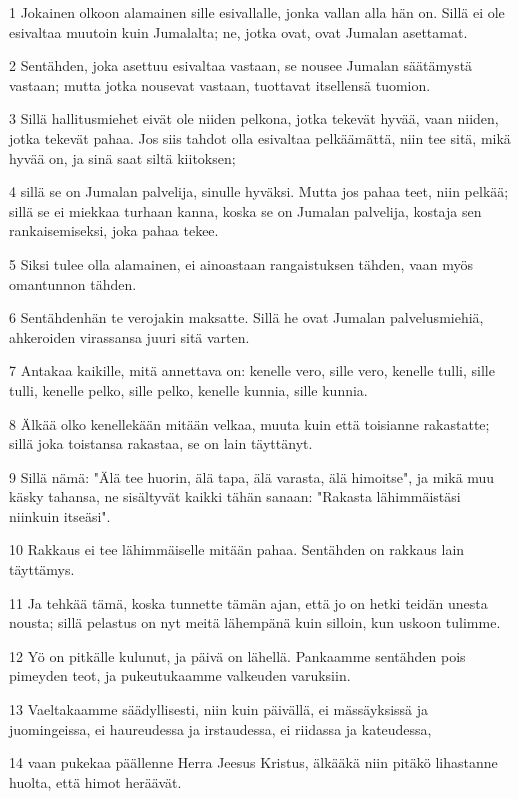 \par 1 Jokainen olkoon alamainen sille esivallalle, jonka vallan alla hän on. Sillä ei ole esivaltaa muutoin kuin Jumalalta; ne, jotka ovat, ovat Jumalan asettamat.
\par 2 Sentähden, joka asettuu esivaltaa vastaan, se nousee Jumalan säätämystä vastaan; mutta jotka nousevat vastaan, tuottavat itsellensä tuomion.
\par 3 Sillä hallitusmiehet eivät ole niiden pelkona, jotka tekevät hyvää, vaan niiden, jotka tekevät pahaa. Jos siis tahdot olla esivaltaa pelkäämättä, niin tee sitä, mikä hyvää on, ja sinä saat siltä kiitoksen;
\par 4 sillä se on Jumalan palvelija, sinulle hyväksi. Mutta jos pahaa teet, niin pelkää; sillä se ei miekkaa turhaan kanna, koska se on Jumalan palvelija, kostaja sen rankaisemiseksi, joka pahaa tekee.
\par 5 Siksi tulee olla alamainen, ei ainoastaan rangaistuksen tähden, vaan myös omantunnon tähden.
\par 6 Sentähdenhän te verojakin maksatte. Sillä he ovat Jumalan palvelusmiehiä, ahkeroiden virassansa juuri sitä varten.
\par 7 Antakaa kaikille, mitä annettava on: kenelle vero, sille vero, kenelle tulli, sille tulli, kenelle pelko, sille pelko, kenelle kunnia, sille kunnia.
\par 8 Älkää olko kenellekään mitään velkaa, muuta kuin että toisianne rakastatte; sillä joka toistansa rakastaa, se on lain täyttänyt.
\par 9 Sillä nämä: "Älä tee huorin, älä tapa, älä varasta, älä himoitse", ja mikä muu käsky tahansa, ne sisältyvät kaikki tähän sanaan: "Rakasta lähimmäistäsi niinkuin itseäsi".
\par 10 Rakkaus ei tee lähimmäiselle mitään pahaa. Sentähden on rakkaus lain täyttämys.
\par 11 Ja tehkää tämä, koska tunnette tämän ajan, että jo on hetki teidän unesta nousta; sillä pelastus on nyt meitä lähempänä kuin silloin, kun uskoon tulimme.
\par 12 Yö on pitkälle kulunut, ja päivä on lähellä. Pankaamme sentähden pois pimeyden teot, ja pukeutukaamme valkeuden varuksiin.
\par 13 Vaeltakaamme säädyllisesti, niin kuin päivällä, ei mässäyksissä ja juomingeissa, ei haureudessa ja irstaudessa, ei riidassa ja kateudessa,
\par 14 vaan pukekaa päällenne Herra Jeesus Kristus, älkääkä niin pitäkö lihastanne huolta, että himot heräävät.

